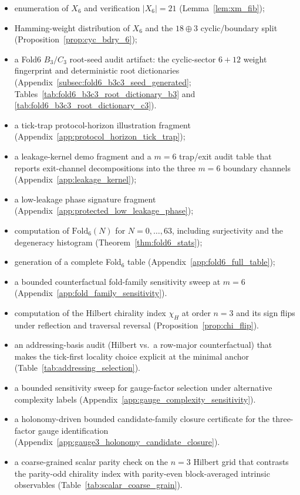 \begin{itemize}
\item enumeration of $X_6$ and verification $|X_6|=21$ (Lemma~\ref{lem:xm_fib});
\item Hamming-weight distribution of $X_6$ and the $18\oplus 3$ cyclic/boundary split (Proposition~\ref{prop:cyc_bdry_6});
\item \AuditTag a Fold6 $B_3/C_3$ root-seed audit artifact: the cyclic-sector $6+12$ weight fingerprint and deterministic root dictionaries (Appendix~\ref{subsec:fold6_b3c3_seed_generated}; Tables~\ref{tab:fold6_b3c3_root_dictionary_b3} and \ref{tab:fold6_b3c3_root_dictionary_c3}).
\item a tick-trap protocol-horizon illustration fragment (Appendix~\ref{app:protocol_horizon_tick_trap});
\item a leakage-kernel demo fragment and a $m=6$ trap/exit audit table that reports exit-channel decompositions into the three $m=6$ boundary channels (Appendix~\ref{app:leakage_kernel});
\item a low-leakage phase signature fragment (Appendix~\ref{app:protected_low_leakage_phase});
\item computation of $\mathrm{Fold}_6(N)$ for $N=0,\dots,63$, including surjectivity and the degeneracy histogram (Theorem~\ref{thm:fold6_stats});
\item generation of a complete Fold$_6$ table (Appendix~\ref{app:fold6_full_table});
\item a bounded counterfactual fold-family sensitivity sweep at $m=6$ (Appendix~\ref{app:fold_family_sensitivity}).
\item computation of the Hilbert chirality index $\chi_H$ at order $n=3$ and its sign flips under reflection and traversal reversal (Proposition~\ref{prop:chi_flip}).
\item an addressing-basis audit (Hilbert vs.\ a row-major counterfactual) that makes the tick-first locality choice explicit at the minimal anchor (Table~\ref{tab:addressing_selection}).
\item a bounded sensitivity sweep for gauge-factor selection under alternative complexity labels (Appendix~\ref{app:gauge_complexity_sensitivity}).
\item a holonomy-driven bounded candidate-family closure certificate for the three-factor gauge identification (Appendix~\ref{app:gauge3_holonomy_candidate_closure}).
\item a coarse-grained scalar parity check on the $n=3$ Hilbert grid that contrasts the parity-odd chirality index with parity-even block-averaged intrinsic observables (Table~\ref{tab:scalar_coarse_grain}).

\end{itemize}
